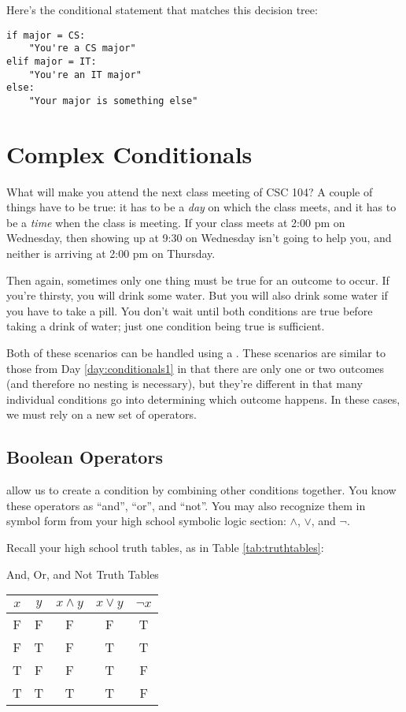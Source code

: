 Here's the conditional statement that matches this decision tree:

\begin{verbatim}
if major = CS:
    "You're a CS major"
elif major = IT:
    "You're an IT major"
else:
    "Your major is something else"
\end{verbatim}

\section{Complex Conditionals}

What will make you attend the next class meeting of CSC 104?  A couple of things have to be true: it has to be a \textit{day} on which the class meets, and it has to be a \textit{time} when the class is meeting.  If your class meets at 2:00 pm on Wednesday, then showing up at 9:30 on Wednesday isn't going to help you, and neither is arriving at 2:00 pm on Thursday.

Then again, sometimes only one thing must be true for an outcome to occur.  If you're thirsty, you will drink some water.  But you will also drink some water if you have to take a pill.  You don't wait until both conditions are true before taking a drink of water; just one condition being true is sufficient.

Both of these scenarios can be handled using a .  These scenarios are similar to those from Day \ref{day:conditionals1} in that there are only one or two outcomes (and therefore no nesting is necessary), but they're different in that many individual conditions go into determining which outcome happens.  In these cases, we must rely on a new set of operators.

\subsection{Boolean Operators}

 allow us to create a condition by combining other conditions together.  You know these operators as ``and'', ``or'', and ``not''.  You may also recognize them in symbol form from your high school symbolic logic section: $\land$, $\lor$, and $\lnot$.

Recall your high school truth tables, as in Table \ref{tab:truthtables}:
\begin{center}
    \begin{mytable}[label=tab:truthtables]{And, Or, and Not Truth Tables}
        \begin{tabulary}{5in}{CCC|C|C}
            $x$ & $y$ & $x \land y$ & $x \lor y$ & $\lnot x$\\
            \hline
            F & F & F & F & T\\
            F & T & F & T & T\\
            T & F & F & T & F\\
            T & T & T & T & F\\
            \hline
        \end{tabulary}
    \end{mytable}
\end{center}

